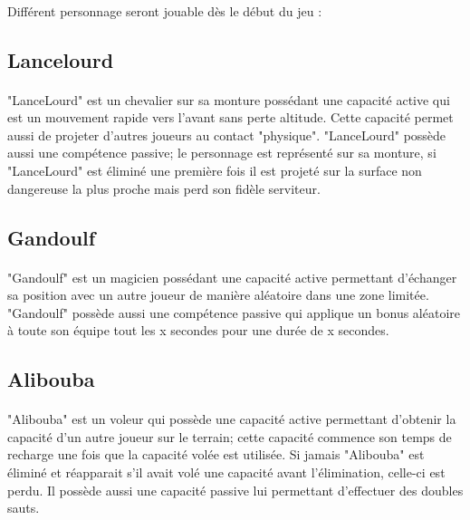 \documentclass[12pt]{report}
\begin{document}
	\paragraph{}
	
		Différent personnage seront jouable dès le début du jeu : 
	
		\subsection{Lancelourd}
		\paragraph{}
			"LanceLourd" est un chevalier sur sa monture possédant une capacité active qui est un mouvement rapide vers l'avant sans perte altitude. Cette capacité permet aussi de projeter d'autres joueurs au contact "physique". "LanceLourd" possède aussi une compétence passive; le personnage est représenté sur sa monture, si "LanceLourd" est éliminé une première fois il est projeté sur la surface non dangereuse la plus proche mais perd son fidèle serviteur.
		
		\subsection{Gandoulf}
		\paragraph{}
			"Gandoulf" est un magicien possédant une capacité active permettant d'échanger sa position avec un autre joueur de manière aléatoire dans une zone limitée. "Gandoulf" possède aussi une compétence passive qui applique un bonus aléatoire à toute son équipe tout les x secondes pour une durée de x secondes.
		
		\subsection{Alibouba}
		\paragraph{}
			"Alibouba" est un voleur qui possède une capacité active permettant d'obtenir la capacité d'un autre joueur sur le terrain; cette capacité commence son temps de recharge une fois que la capacité volée est utilisée. Si jamais "Alibouba" est éliminé et réapparait s'il avait volé une capacité avant l'élimination, celle-ci est perdu. Il possède aussi une capacité passive lui permettant d'effectuer des doubles sauts.
		
\end{document}
